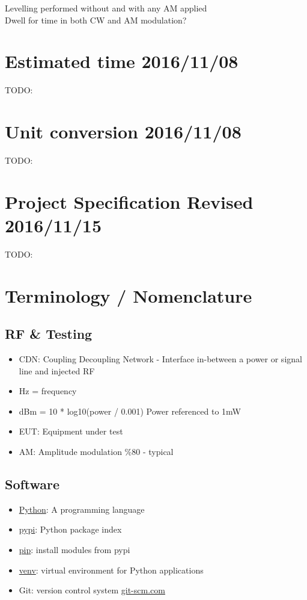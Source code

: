 \documentclass[a4paper]{article}
\begin{document}
Levelling performed without and with any AM applied\\
Dwell for time in both CW and AM modulation?\\

\section{Estimated time 2016/11/08}
TODO:

\section{Unit conversion 2016/11/08}
TODO:

\section{Project Specification Revised 2016/11/15}
TODO:

\newpage

\section{Terminology  /  Nomenclature}


\subsection{RF \& Testing}
\begin{itemize}
\item CDN: Coupling Decoupling Network - Interface in-between a power or signal line and injected RF
\item Hz = frequency
\item dBm = 10 * log10(power / 0.001) Power referenced to 1mW
\item EUT: Equipment under test
\item AM: Amplitude modulation \%80 - typical
\end{itemize}

\subsection{Software}
\begin{itemize}
\item \href{https://www.python.org/}{Python}: A programming language
\item \href{https://pypi.python.org/pypi}{pypi}: Python package index
\item \href{https://pypi.python.org/pypi/pip}{pip}: install modules from pypi
\item \href{https://docs.python.org/3/library/venv.html}{venv}: virtual environment for Python applications
\item Git: version control system \href{https://git-scm.com}{git-scm.com}
\end{itemize}
\end{document}
